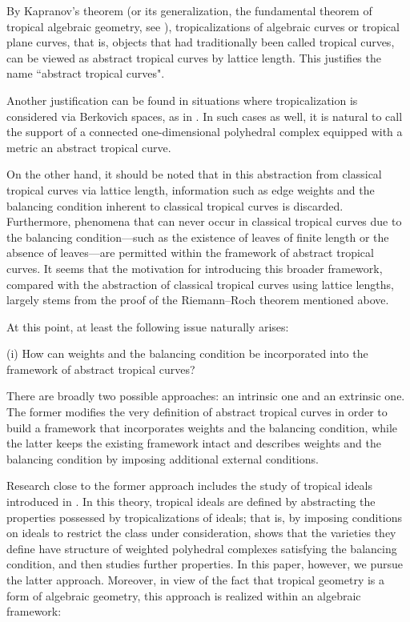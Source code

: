 \documentclass[a4paper,12pt]{amsart}
\begin{document}
By Kapranov’s theorem (or its generalization, the fundamental theorem of tropical algebraic geometry, see \cite[Subsections~3.1 and 3.2]{Maclagan=Sturmfels}), tropicalizations of algebraic curves or tropical plane curves, that is, objects that had traditionally been called tropical curves, can be viewed as abstract tropical curves by lattice length.
This justifies the name ``abstract tropical curves".

Another justification can be found in situations where tropicalization is considered via Berkovich spaces, as in \cite{Amini=Baker=Brugalle=Rabinoff}.
In such cases as well, it is natural to call the support of a connected one-dimensional polyhedral complex equipped with a metric an abstract tropical curve.

On the other hand, it should be noted that in this abstraction from classical tropical curves via lattice length, information such as edge weights and the balancing condition inherent to classical tropical curves is discarded.
Furthermore, phenomena that can never occur in classical tropical curves due to the balancing condition—such as the existence of leaves of finite length or the absence of leaves—are permitted within the framework of abstract tropical curves.
It seems that the motivation for introducing this broader framework, compared with the abstraction of classical tropical curves using lattice lengths, largely stems from the proof of the Riemann--Roch theorem mentioned above.

At this point, at least the following issue naturally arises:

(i) How can weights and the balancing condition be incorporated into the framework of abstract tropical curves?

There are broadly two possible approaches: an intrinsic one and an extrinsic one.
The former modifies the very definition of abstract tropical curves in order to build a framework that incorporates weights and the balancing condition, while the latter keeps the existing framework intact and describes weights and the balancing condition by imposing additional external conditions.

Research close to the former approach includes the study of tropical ideals introduced in \cite{Maclagan=Rincon}.
In this theory, tropical ideals are defined by abstracting the properties possessed by tropicalizations of ideals; that is, by imposing conditions on ideals to restrict the class under consideration, \cite{Maclagan=Rincon2} shows that the varieties they define have structure of weighted polyhedral complexes satisfying the balancing condition, and then studies further properties.
In this paper, however, we pursue the latter approach.
Moreover, in view of the fact that tropical geometry is a form of algebraic geometry, this approach is realized within an algebraic framework:
\end{document}

